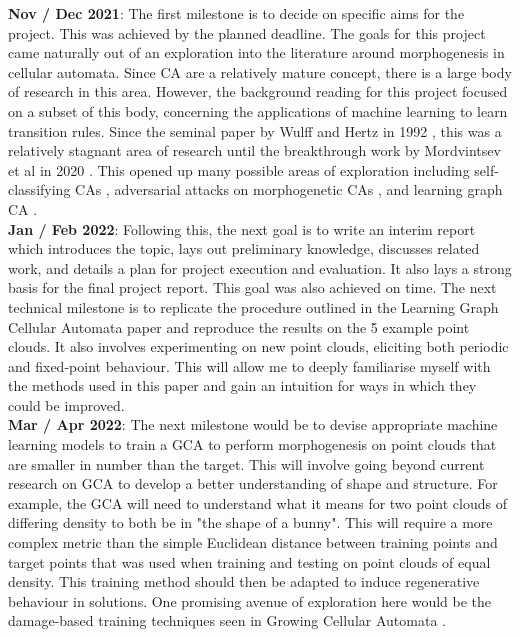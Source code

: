 \textbf{Nov / Dec 2021}: The first milestone is to decide on specific aims for the project. 
This was achieved by the planned deadline. 
The goals for this project came naturally out of an exploration into the literature around morphogenesis in cellular automata.
Since CA are a relatively mature concept, there is a large body of research in this area.
However, the background reading for this project focused on a subset of this body, concerning the applications of machine learning to learn transition rules.
Since the seminal paper by Wulff and Hertz in 1992 \cite{wulff1992learning}, this was a relatively stagnant area of research until the breakthrough work by Mordvintsev et al in 2020 \cite{mordvintsev2020growing}.
This opened up many possible areas of exploration including self-classifying CAs \cite{randazzo2020self-classifying}, adversarial attacks on morphogenetic CAs \cite{randazzo2021adversarial}, and learning graph CA \cite{grattarola2021learning}.\\

\textbf{Jan / Feb 2022}: Following this, the next goal is to write an interim report which introduces the topic, lays out preliminary knowledge, discusses related work, and details a plan for project execution and evaluation.
It also lays a strong basis for the final project report.
This goal was also achieved on time.
The next technical milestone is to replicate the procedure outlined in the Learning Graph Cellular Automata paper \cite{grattarola2021learning} and reproduce the results on the 5 example point clouds.
It also involves experimenting on new point clouds, eliciting both periodic and fixed-point behaviour.
This will allow me to deeply familiarise myself with the methods used in this paper and gain an intuition for ways in which they could be improved.\\

\textbf{Mar / Apr 2022}: The next milestone would be to devise appropriate machine learning models to train a GCA to perform morphogenesis on point clouds that are smaller in number than the target. 
This will involve going beyond current research on GCA to develop a better understanding of shape and structure. 
For example, the GCA will need to understand what it means for two point clouds of differing density to both be in "the shape of a bunny". 
This will require a more complex metric than the simple Euclidean distance between training points and target points that was used when training and testing on point clouds of equal density.
This training method should then be adapted to induce regenerative behaviour in solutions.
One promising avenue of exploration here would be the damage-based training techniques seen in Growing Cellular Automata \cite{mordvintsev2020growing}.\\

